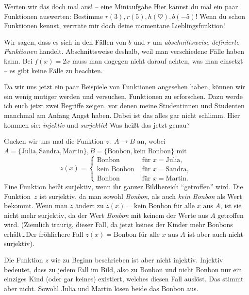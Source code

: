 \documentclass[a4paper,ngerman,12pt]{zirkelblatt1415}
\theoremstyle{definition}
\theoremstyle{remark}
\begin{document}
\begin{aufgabe}{Werten wir das doch mal aus! -- eine Miniaufgabe}
 Hier kannst du mal ein paar Funktionen auswerten:
 Bestimme $r(3), r(5), h(\heartsuit), b(-5)$!
 Wenn du schon Funktionen kennst, verrrate mir doch deine momentane Lieblingsfunktion!
\end{aufgabe}

Wir sagen, dass es sich in den Fällen von $b$ und $r$ um \emph{abschnittsweise definierte Funktionen} handelt.
Abschnittsweise deshalb, weil man verschiedene Fälle haben kann. Bei $f(x) = 2x$ muss man dagegen nicht darauf achten, was man einsetzt -- 
es gibt keine Fälle zu beachten.

Da wir uns jetzt ein paar Beispiele von Funktionen angesehen haben, 
können wir ein wenig mutiger werden und versuchen, Funktionen zu erforschen.
Dazu werde ich euch jetzt zwei Begriffe zeigen, vor denen meine Studentinnen und Studenten manchmal am Anfang Angst haben. 
Dabei ist das alles gar nicht schlimm.
Hier kommen sie: \emph{injektiv} und \emph{surjektiv}!
Was heißt das jetzt genau?

Gucken wir uns mal die Funktion $z \,:\, A \to B$ an, wobei 
$A = \{ \text{Julia}, \text{Sandra}, \text{Martin}\}, B = \{\text{Bonbon}, \text{kein Bonbon} \}$ mit 
\[ z(x) =\begin{cases} 
      \text{Bonbon} & \text{ für } x = \text{Julia}, \\
      \text{kein Bonbon}  & \text{ für } x = \text{Sandra}, \\
      \text{Bonbon} & \text{ für } x = \text{Martin}.  
  \end{cases}
\]
Eine Funktion heißt surjektiv, wenn ihr ganzer Bildbereich "`getroffen"' wird. 
Die Funktion~$z$ ist surjektiv, da man sowohl \emph{Bonbon}, als auch \emph{kein Bonbon} als Wert bekommt.
Wenn man $z$ ändert zu $z(x) = \text{kein Bonbon für alle $x$ aus }A$, ist sie nicht mehr surjektiv,
da der Wert \emph{Bonbon} mit keinem der Werte aus $A$ getroffen wird. 
(Ziemlich traurig, dieser Fall, da jetzt keines der Kinder mehr Bonbons erhält\ldots Der fröhlichere Fall 
 $z(x) = \text{Bonbon für alle $x$ aus }A$ ist aber auch nicht surjektiv).

Die Funktion $z$ wie zu Beginn beschrieben ist aber nicht injektiv. Injektiv bedeutet, dass zu jedem Fall im Bild, also zu 
Bonbon und nicht Bonbon nur ein einziges Kind (oder gar keines) existiert, welches diesen Fall auslöst. 
Das stimmt aber nicht. Sowohl Julia und Martin lösen beide das Bonbon aus.
\end{document}
